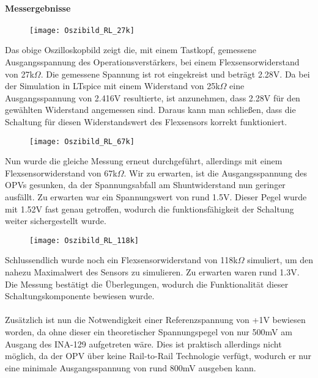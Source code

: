 \documentclass[titlepage,12pt,twoside]{article}
\begin{document}
\paragraph{Messergebnisse}
\hfill \break
\hfill \break
\begin{figure}[H]
	\begin{center}
		\scalebox{1.2}
		{\texttt{[image: Oszibild\_RL\_27k]}}
	\end{center}
\end{figure}
Das obige Oszilloskopbild zeigt die, mit einem Tastkopf, gemessene Ausgangsspannung des Operationsverstärkers, bei einem Flexsensorwiderstand
von 27k$\Omega$. Die gemessene Spannung ist rot eingekreist und beträgt 2.28V. Da bei der Simulation in LTspice mit einem Widerstand 
von 25k$\Omega$ eine Ausgangsspannung von 2.416V resultierte, ist anzunehmen, dass 2.28V 
für den gewählten Widerstand angemessen sind. Daraus kann man schließen, dass die Schaltung
für diesen Widerstandswert des Flexsensors korrekt funktioniert.
\\
\begin{figure}[H]
	\begin{center}
		\scalebox{1.0}
		{\texttt{[image: Oszibild\_RL\_67k]}}
	\end{center}
\end{figure}
\hfill \break
Nun wurde die gleiche Messung erneut durchgeführt, allerdings mit einem Flexsensorwiderstand
von 67k$\Omega$. Wir zu erwarten, ist die Ausgangsspannung des OPVs gesunken, da der 
Spannungsabfall am Shuntwiderstand nun geringer ausfällt. Zu erwarten war ein Spannungswert
von rund 1.5V. Dieser Pegel wurde mit 1.52V fast genau getroffen, wodurch die funktionsfähigkeit
der Schaltung weiter sichergestellt wurde.
\begin{figure}[H]
	\begin{center}
		\scalebox{1.0}
		{\texttt{[image: Oszibild\_RL\_118k]}}
	\end{center}
\end{figure}
\hfill \break
Schlussendlich wurde noch ein Flexsensorwiderstand von 118k$\Omega$ simuliert, um den
nahezu Maximalwert des Sensors zu simulieren. Zu erwarten waren rund 1.3V. Die Messung
bestätigt die Überlegungen, wodurch die Funktionalität dieser Schaltungskomponente bewiesen
wurde. \\
\\
Zusätzlich ist nun die Notwendigkeit einer Referenzspannung von +1V bewiesen worden, da
ohne dieser ein theoretischer Spannungspegel von nur 500mV am Ausgang des INA-129 aufgetreten
wäre.  Dies ist praktisch allerdings nicht möglich, da der OPV über keine Rail-to-Rail
Technologie verfügt, wodurch er nur eine minimale Ausgangsspannung von rund 800mV ausgeben 
kann.
\\
\end{document}

